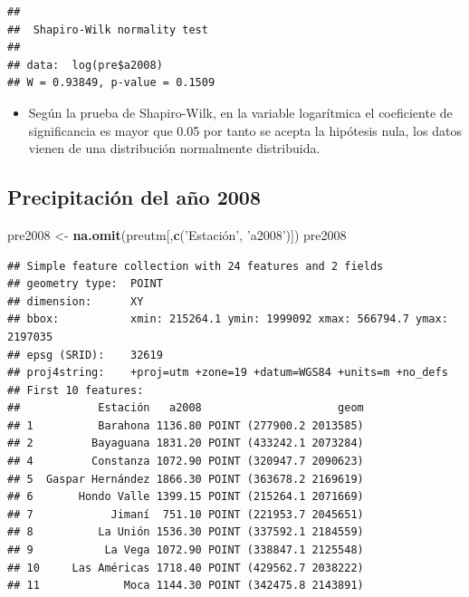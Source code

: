 \documentclass[11pt,]{article}
\newenvironment{Shaded}{\begin{snugshade}}{\end{snugshade}}
\newcommand{\KeywordTok}[1]{\textcolor[rgb]{0.13,0.29,0.53}{\textbf{#1}}}
\newcommand{\StringTok}[1]{\textcolor[rgb]{0.31,0.60,0.02}{#1}}
\newcommand{\OperatorTok}[1]{\textcolor[rgb]{0.81,0.36,0.00}{\textbf{#1}}}
\newcommand{\NormalTok}[1]{#1}
\providecommand{\tightlist}{%
\setlength{\itemsep}{0pt}\setlength{\parskip}{0pt}}
\begin{document}
\begin{Shaded}
\end{Shaded}

\begin{verbatim}
## 
##  Shapiro-Wilk normality test
## 
## data:  log(pre$a2008)
## W = 0.93849, p-value = 0.1509
\end{verbatim}

\begin{itemize}
\tightlist
\item
  Según la prueba de Shapiro-Wilk, en la variable logarítmica el
  coeficiente de significancia es mayor que 0.05 por tanto se acepta la
  hipótesis nula, los datos vienen de una distribución normalmente
  distribuida.
\end{itemize}

\subsection{Precipitación del año
2008}\label{precipitaciuxf3n-del-auxf1o-2008}

\begin{Shaded}
\begin{Highlighting}[]
\NormalTok{pre2008 <-}\StringTok{ }\KeywordTok{na.omit}\NormalTok{(preutm[,}\KeywordTok{c}\NormalTok{(}\StringTok{'Estación', '}\NormalTok{a2008}\StringTok{')])}
\StringTok{pre2008}
\end{Highlighting}
\end{Shaded}

\begin{verbatim}
## Simple feature collection with 24 features and 2 fields
## geometry type:  POINT
## dimension:      XY
## bbox:           xmin: 215264.1 ymin: 1999092 xmax: 566794.7 ymax: 2197035
## epsg (SRID):    32619
## proj4string:    +proj=utm +zone=19 +datum=WGS84 +units=m +no_defs
## First 10 features:
##            Estación   a2008                     geom
## 1          Barahona 1136.80 POINT (277900.2 2013585)
## 2         Bayaguana 1831.20 POINT (433242.1 2073284)
## 4         Constanza 1072.90 POINT (320947.7 2090623)
## 5  Gaspar Hernández 1866.30 POINT (363678.2 2169619)
## 6       Hondo Valle 1399.15 POINT (215264.1 2071669)
## 7            Jimaní  751.10 POINT (221953.7 2045651)
## 8          La Unión 1536.30 POINT (337592.1 2184559)
## 9           La Vega 1072.90 POINT (338847.1 2125548)
## 10     Las Américas 1718.40 POINT (429562.7 2038222)
## 11             Moca 1144.30 POINT (342475.8 2143891)
\end{verbatim}
\end{document}

